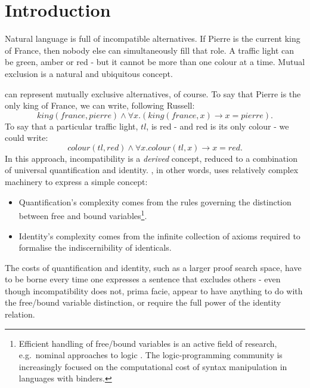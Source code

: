 \section{Introduction}\label{introduction}

Natural language is full of incompatible alternatives.
If Pierre is the current king of France, then nobody else can simultaneously fill that role.
A traffic light can be green, amber or red - but it cannot be more than one colour at a time.
Mutual exclusion is a natural and ubiquitous concept.

\FOL{} can represent mutually exclusive alternatives, of course.
To say that Pierre is the only king of France, we can write, following Russell:
\[
king(france, pierre) \land \forall x . (king(france, x) \rightarrow x = pierre).
\]
To say that a particular traffic light, $tl$, is red - and red is its only colour - we could write:
\[
colour(tl, red) \land \forall x . colour(tl, x) \rightarrow x = red.
\]
In this approach, incompatibility is a \emph{derived} concept, reduced to 
a combination of universal quantification and identity.  
\FOL{}, in other words, uses relatively complex machinery to express a
simple concept:
\begin{itemize}

\item Quantification's complexity comes from the
  rules governing the distinction between free
  and bound variables\footnote{Efficient handling of free/bound variables
    is an active field of research, e.g.~nominal approaches to logic
    \cite{PittsAM:nomsetnasics}. The logic-programming community is increasingly focused on the computational cost of
    syntax manipulation in languages with binders.}.

\item Identity's complexity comes from the infinite collection of axioms required to formalise the
  indiscernibility of identicals.

\end{itemize}

\NI The costs of quantification and identity, such as a larger proof
search space, have to be borne every time one expresses a sentence that excludes others - even
though incompatibility does not, prima facie, appear to have anything to do
with the free/bound variable distinction, or require the full power of 
the identity relation.

